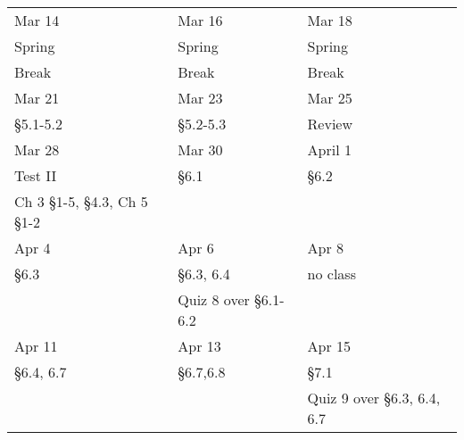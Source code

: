 \documentclass[11pt]{article}
\begin{document}
\begin{tabular}{|l|l|l|}
\hline
Mar 14& Mar 16 &Mar 18 \\
Spring&Spring&Spring\\
Break&Break&Break\\
\hline
Mar 21& Mar 23 & Mar 25 \\
\S 5.1-5.2& \S 5.2-5.3 &Review \\
\hline
Mar 28&Mar 30& April 1\\
Test II & \S 6.1 & \S 6.2 \\
Ch 3 \S 1-5, \S 4.3, Ch 5 \S 1-2 \quad&&\\
\hline
Apr 4 & Apr 6 & Apr 8 \\
\S 6.3 & \S 6.3, 6.4 & no class \\
& Quiz 8 over \S 6.1-6.2 & \\
\hline
Apr 11 & Apr 13 & Apr 15 \\
\S 6.4, 6.7 & \S 6.7,6.8 & \S 7.1 \\
&& Quiz 9 over \S 6.3, 6.4, 6.7 \\
\hline
\end{tabular}
\end{document}
